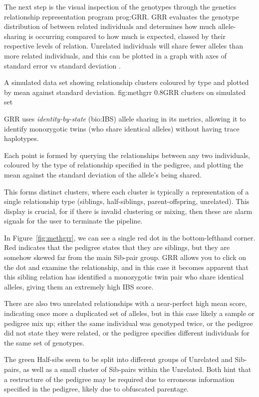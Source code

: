 The next step is the visual inspection of the genotypes through the genetics relationship representation program \gls{prog:GRR}. GRR evaluates the genotype distribution of between related individuals and determines how much allele-sharing is occurring compared to how much is expected, classed by their respective levels of relation. Unrelated individuals will share fewer alleles than more related individuals, and this can be plotted in a graph with axes of standard error vs standard deviation \cite{grr}.

{A simulated data set showing relationship clusters coloured by type and plotted by mean against standard deviation.}
{fig:methgrr}
{0.8}{GRR clusters on simulated set}

GRR uses \textit{identity-by-state} (\gls{bio:IBS}) allele sharing in its metrics, allowing it to identify monozygotic twins (who share identical alleles) without having trace haplotypes.

Each point is formed by querying the relationships between any two individuals, coloured by the type of relationship specified in the pedigree, and plotting the mean against the standard deviation of the allele's being shared.

This forms distinct clusters, where each cluster is typically a representation of a single relationship type (siblings, half-siblings, parent-offspring, unrelated). This display is crucial, for if there is invalid clustering or mixing, then these are alarm signals for the user to terminate the pipeline.

In Figure~\ref{fig:methgrr}, we can see a single red dot in the bottom-lefthand corner. Red indicates that the pedigree states that they are siblings, but they are somehow skewed far from the main Sib-pair group. GRR allows you to click on the dot and examine the relationship, and in this case it becomes apparent that this sibling relation has identified a monozygotic twin pair who share identical alleles, giving them an extremely high IBS score.

There are also two unrelated relationships with a near-perfect high mean score, indicating once more a duplicated set of alleles, but in this case likely a sample or pedigree mix up; either the same individual was genotyped twice, or the pedigree did not state they were related, or the pedigree specifies different individuals for the same set of genotypes.

The green Half-sibs seem to be split into different groups of Unrelated and Sib-pairs, as well as a small cluster of Sib-pairs within the Unrelated. Both hint that a restructure of the pedigree may be required due to erroneous information specified in the pedigree, likely due to obfuscated parentage.

